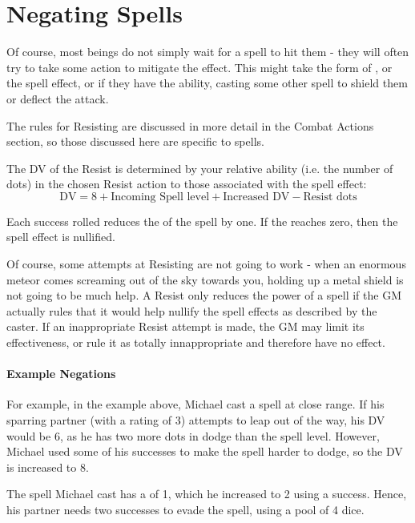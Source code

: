 \chapter{Negating Spells}

Of course, most beings do not simply wait for a spell to hit them - they will often try to take some action to mitigate the effect. This might take the form of ,  or  the spell effect, or if they have the ability, casting some other spell to shield them or deflect the attack. 

The rules for Resisting are discussed in more detail in the Combat Actions section, so those discussed here are specific to spells. 

The DV of the Resist is determined by your relative ability (i.e. the number of dots) in the chosen Resist action to those associated with the spell effect:
$$ \text{DV}  = 8 + \text{Incoming Spell level} + \text{Increased DV} - \text{Resist dots} $$

Each success rolled reduces the  of the spell by one. If the  reaches zero, then the spell effect is nullified. 


Of course, some attempts at Resisting are not going to work - when an enormous meteor comes screaming out of the sky towards you, holding up a metal shield is not going to be much help. A Resist only reduces the power of a spell if the GM actually rules that it would help nullify the spell effects as described by the caster. If an inappropriate Resist attempt is made, the GM may limit its effectiveness, or rule it as totally innappropriate and therefore have no effect. 

\subsubsection{Example Negations}

For example, in the example above, Michael cast a \levelOne{} spell at close range. If his sparring partner (with a  rating of 3) attempts to leap out of the way, his DV would be 6, as he has two more dots in dodge than the spell level. However, Michael used some of his successes to make the spell harder to dodge, so the DV is increased to 8. 

The spell Michael cast has a  of 1, which he increased to 2 using a success. Hence, his partner needs two successes to evade the spell, using a  pool of 4 dice. 


